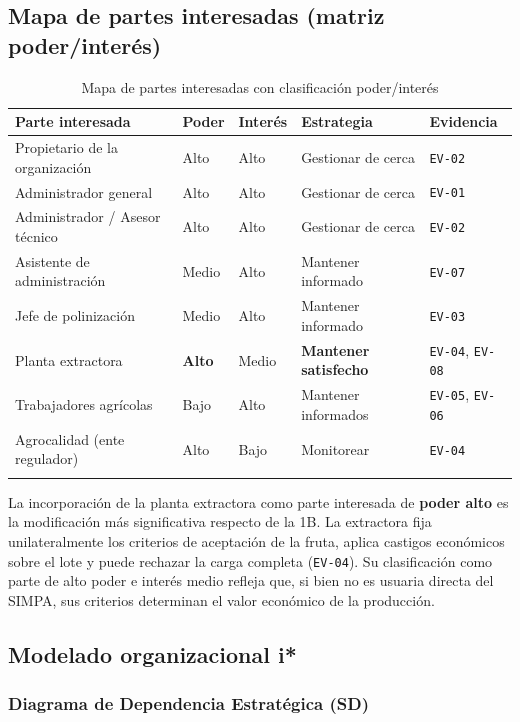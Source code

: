 \documentclass[11pt,a4paper]{article}
\newcommand{\id}[1]{\texttt{\begingroup\hyphenpenalty=10000\relax#1\endgroup}}
\renewcommand{\id}[1]{\texttt{#1}}
\begin{document}
\subsection{Mapa de partes interesadas (matriz poder/interés)}

\begin{longtable}{|L{4.2cm}|C{1.8cm}|C{1.8cm}|L{3.4cm}|C{2.2cm}|}
\hline
{}\textbf{Parte interesada} & \textbf{Poder} & \textbf{Interés} & \textbf{Estrategia} & \textbf{Evidencia} \\
\hline
\endhead
Propietario de la organización & Alto & Alto & Gestionar de cerca & \id{EV-02} \\ \hline
Administrador general & Alto & Alto & Gestionar de cerca & \id{EV-01} \\ \hline
Administrador / Asesor técnico & Alto & Alto & Gestionar de cerca & \id{EV-02} \\ \hline
Asistente de administración & Medio & Alto & Mantener informado & \id{EV-07} \\ \hline
Jefe de polinización & Medio & Alto & Mantener informado & \footnotesize \id{EV-03} \\ \hline
Planta extractora & \textbf{Alto} & Medio & \textbf{Mantener satisfecho} & \id{EV-04}, \id{EV-08} \\ \hline
Trabajadores agrícolas & Bajo & Alto & Mantener informados & \id{EV-05}, \id{EV-06} \\ \hline
Agrocalidad (ente regulador) & Alto & Bajo & Monitorear & \footnotesize \id{EV-04} \\ \hline
\caption{Mapa de partes interesadas con clasificación poder/interés}
\end{longtable}

\noindent
La incorporación de la planta extractora como parte interesada de \textbf{poder alto} es la
modificación más significativa respecto de la 1B. La extractora fija unilateralmente los criterios
de aceptación de la fruta, aplica castigos económicos sobre el lote y puede rechazar la carga
completa (\id{EV-04}). Su clasificación como parte de alto poder e interés medio refleja que, si
bien no es usuaria directa del SIMPA, sus criterios determinan el valor económico de la producción.

\subsection{Modelado organizacional i*}

\subsubsection{Diagrama de Dependencia Estratégica (SD)}
\end{document}
